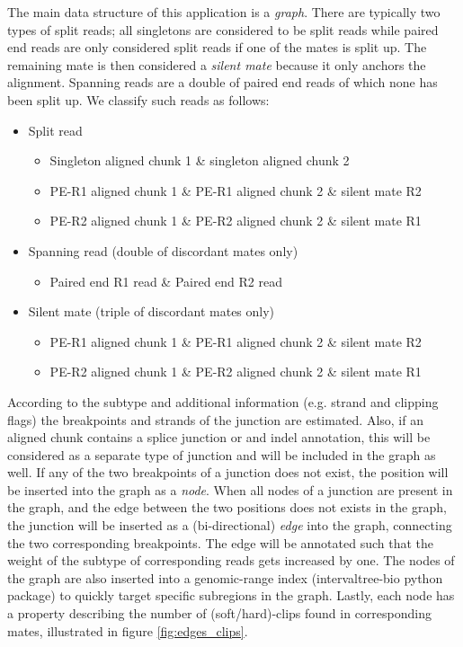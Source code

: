 \documentclass{article}
\theoremstyle{definition}
\begin{document}
The main data structure of this application is a \textit{graph}. There are typically two types of split reads; all singletons are considered to be split reads while paired end reads are only considered split reads if one of the mates is split up.
The remaining mate is then considered a \textit{silent mate} because it only anchors the alignment.
Spanning reads are a double of paired end reads of which none has been split up.
We classify such reads as follows:
\begin{itemize}
	\item Split read
	\begin{itemize}
		\item Singleton aligned chunk 1 \& singleton aligned chunk 2
		\item PE-R1 aligned chunk 1 \& PE-R1 aligned chunk 2 \& silent mate R2
		\item PE-R2 aligned chunk 1 \& PE-R2 aligned chunk 2 \& silent mate R1
	\end{itemize}
	\item Spanning read (double of discordant mates only)
	\begin{itemize}
		\item Paired end R1 read \& Paired end R2 read
	\end{itemize}
	\item Silent mate (triple of discordant mates only)
	\begin{itemize}
		\item PE-R1 aligned chunk 1 \& PE-R1 aligned chunk 2 \& silent mate R2
		\item PE-R2 aligned chunk 1 \& PE-R2 aligned chunk 2 \& silent mate R1
	\end{itemize}
\end{itemize}

According to the subtype and additional information (e.g. strand and clipping flags) the breakpoints and strands of the junction are estimated.
Also, if an aligned chunk contains a splice junction or and indel annotation, this will be considered as a separate type of junction and will be included in the graph as well.
If any of the two breakpoints of a junction does not exist, the position will be inserted into the graph as a \textit{node}.
When all nodes of a junction are present in the graph, and the edge between the two positions does not exists in the graph, the junction will be inserted as a (bi-directional) \textit{edge} into the graph, connecting the two corresponding breakpoints.
The edge will be annotated such that the weight of the subtype of corresponding reads gets increased by one.
The nodes of the graph are also inserted into a genomic-range index (intervaltree-bio python package) to quickly target specific subregions in the graph.
Lastly, each node has a property describing the number of (soft/hard)-clips found in corresponding mates, illustrated in figure \ref{fig:edges_clips}.
\end{document}
